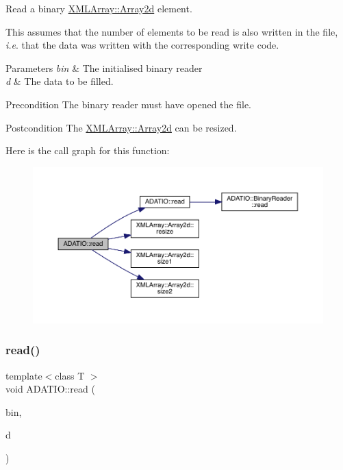 Read a binary \mbox{\hyperlink{classXMLArray_1_1Array2d}{X\+M\+L\+Array\+::\+Array2d}} element. 

This assumes that the number of elements to be read is also written in the file, {\itshape i.\+e}. that the data was written with the corresponding write code. 
\begin{DoxyParams}{Parameters}
{\em bin} & The initialised binary reader \\
\hline
{\em d} & The data to be filled.\\
\hline
\end{DoxyParams}
\begin{DoxyPrecond}{Precondition}
The binary reader must have opened the file. 
\end{DoxyPrecond}
\begin{DoxyPostcond}{Postcondition}
The \mbox{\hyperlink{classXMLArray_1_1Array2d}{X\+M\+L\+Array\+::\+Array2d}} can be resized. 
\end{DoxyPostcond}
Here is the call graph for this function\+:\nopagebreak
\begin{figure}[H]
\begin{center}
\leavevmode
\includegraphics[width=350pt]{d0/dba/namespaceADATIO_a9a2262a21e8dd6377d669f96ef9276b9_cgraph}
\end{center}
\end{figure}
\mbox{\label{namespaceADATIO_ac8f475cc894abb16b89f3e73e1132bce}} 
\subsubsection{\texorpdfstring{read()}{read()}\hspace{0.1cm}{\footnotesize\ttfamily [21/28]}}
{\footnotesize\ttfamily template$<$class T $>$ \\
void A\+D\+A\+T\+I\+O\+::read (\begin{DoxyParamCaption}\item[{\mbox{\hyperlink{classADATIO_1_1BinaryReader}{Binary\+Reader}} \&}]{bin,  }\item[{\mbox{\hyperlink{classXMLArray_1_1Array3d}{X\+M\+L\+Array\+::\+Array3d}}$<$ T $>$ \&}]{d }\end{DoxyParamCaption})\hspace{0.3cm}{\ttfamily [inline]}}



